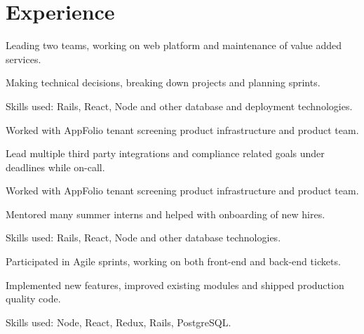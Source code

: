 \section{Experience}

    \begin{tightemize}
      \item Leading two teams, working on web platform and maintenance of value added services.
      \item Making technical decisions, breaking down projects and planning sprints.
      \item Skills used: Rails, React, Node and other database and deployment technologies.
    \end{tightemize} 
    \sectionsep

    \begin{tightemize}
      \item Worked with AppFolio tenant screening product infrastructure and product team.
      \item Lead multiple third party integrations and compliance related goals under deadlines while on-call.
    \end{tightemize} 
    \sectionsep

    \begin{tightemize}
      \item Worked with AppFolio tenant screening product infrastructure and product team.
      \item Mentored many summer interns and helped with onboarding of new hires.
      \item Skills used: Rails, React, Node and other database technologies.
    \end{tightemize}
    \sectionsep

    \begin{tightemize}
      \item Participated in Agile sprints, working on both front-end and back-end tickets.
      \item Implemented new features, improved existing modules and shipped production quality code.
      \item Skills used: Node, React, Redux, Rails, PostgreSQL.
    \end{tightemize}
    \sectionsep

